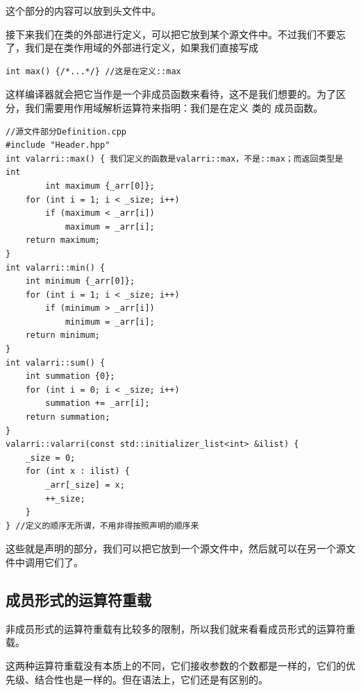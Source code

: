 这个部分的内容可以放到头文件中。\par
接下来我们在类的外部进行定义，可以把它放到某个源文件中。不过我们不要忘了，我们是在类作用域的外部进行定义，如果我们直接写成
\begin{lstlisting}
int max() {/*...*/} //这是在定义::max
\end{lstlisting}
这样编译器就会把它当作是一个非成员函数来看待，这不是我们想要的。为了区分，我们需要用作用域解析运算符来指明：我们是在定义 \lstinline@valarri@ 类的 \lstinline@max@ 成员函数。
\begin{lstlisting}
//源文件部分Definition.cpp
#include "Header.hpp"
int valarri::max() { 我们定义的函数是valarri::max，不是::max；而返回类型是int
        int maximum {_arr[0]};
    for (int i = 1; i < _size; i++)
        if (maximum < _arr[i])
            maximum = _arr[i];
    return maximum;
}
int valarri::min() {
    int minimum {_arr[0]};
    for (int i = 1; i < _size; i++)
        if (minimum > _arr[i])
            minimum = _arr[i];
    return minimum;
}
int valarri::sum() {
    int summation {0};
    for (int i = 0; i < _size; i++)
        summation += _arr[i];
    return summation;
}
valarri::valarri(const std::initializer_list<int> &ilist) {
    _size = 0;
    for (int x : ilist) {
        _arr[_size] = x;
        ++_size;
    }
} //定义的顺序无所谓，不用非得按照声明的顺序来
\end{lstlisting}
这些就是声明的部分，我们可以把它放到一个源文件中，然后就可以在另一个源文件中调用它们了。\par
\subsection*{成员形式的运算符重载}
非成员形式的运算符重载有比较多的限制，所以我们就来看看成员形式的运算符重载。\par
这两种运算符重载没有本质上的不同，它们接收参数的个数都是一样的，它们的优先级、结合性也是一样的。但在语法上，它们还是有区别的。\par
